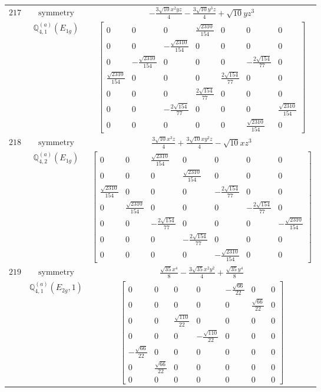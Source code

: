\documentclass[fleqn,8pt,landscape]{jsarticle}
\begin{document}
\begin{longtable}{ccc}
$ 217 $ & $ \text{symmetry} $ & $ - \frac{3 \sqrt{10} x^{2} y z}{4} - \frac{3 \sqrt{10} y^{3} z}{4} + \sqrt{10} y z^{3} $ \\
$  $ & $ \mathbb{Q}_{4,1}^{(a)}(E_{1g}) $ & $ \begin{bmatrix} 0 & 0 & 0 & \frac{\sqrt{2310}}{154} & 0 & 0 & 0 \\ 0 & 0 & - \frac{\sqrt{2310}}{154} & 0 & 0 & 0 & 0 \\ 0 & - \frac{\sqrt{2310}}{154} & 0 & 0 & 0 & - \frac{2 \sqrt{154}}{77} & 0 \\ \frac{\sqrt{2310}}{154} & 0 & 0 & 0 & \frac{2 \sqrt{154}}{77} & 0 & 0 \\ 0 & 0 & 0 & \frac{2 \sqrt{154}}{77} & 0 & 0 & 0 \\ 0 & 0 & - \frac{2 \sqrt{154}}{77} & 0 & 0 & 0 & \frac{\sqrt{2310}}{154} \\ 0 & 0 & 0 & 0 & 0 & \frac{\sqrt{2310}}{154} & 0 \end{bmatrix} $ \\ \hline
$ 218 $ & $ \text{symmetry} $ & $ \frac{3 \sqrt{10} x^{3} z}{4} + \frac{3 \sqrt{10} x y^{2} z}{4} - \sqrt{10} x z^{3} $ \\
$  $ & $ \mathbb{Q}_{4,2}^{(a)}(E_{1g}) $ & $ \begin{bmatrix} 0 & 0 & \frac{\sqrt{2310}}{154} & 0 & 0 & 0 & 0 \\ 0 & 0 & 0 & \frac{\sqrt{2310}}{154} & 0 & 0 & 0 \\ \frac{\sqrt{2310}}{154} & 0 & 0 & 0 & - \frac{2 \sqrt{154}}{77} & 0 & 0 \\ 0 & \frac{\sqrt{2310}}{154} & 0 & 0 & 0 & - \frac{2 \sqrt{154}}{77} & 0 \\ 0 & 0 & - \frac{2 \sqrt{154}}{77} & 0 & 0 & 0 & - \frac{\sqrt{2310}}{154} \\ 0 & 0 & 0 & - \frac{2 \sqrt{154}}{77} & 0 & 0 & 0 \\ 0 & 0 & 0 & 0 & - \frac{\sqrt{2310}}{154} & 0 & 0 \end{bmatrix} $ \\ \hline
$ 219 $ & $ \text{symmetry} $ & $ \frac{\sqrt{35} x^{4}}{8} - \frac{3 \sqrt{35} x^{2} y^{2}}{4} + \frac{\sqrt{35} y^{4}}{8} $ \\
$  $ & $ \mathbb{Q}_{4,1}^{(a)}(E_{2g},1) $ & $ \begin{bmatrix} 0 & 0 & 0 & 0 & - \frac{\sqrt{66}}{22} & 0 & 0 \\ 0 & 0 & 0 & 0 & 0 & \frac{\sqrt{66}}{22} & 0 \\ 0 & 0 & \frac{\sqrt{110}}{22} & 0 & 0 & 0 & 0 \\ 0 & 0 & 0 & - \frac{\sqrt{110}}{22} & 0 & 0 & 0 \\ - \frac{\sqrt{66}}{22} & 0 & 0 & 0 & 0 & 0 & 0 \\ 0 & \frac{\sqrt{66}}{22} & 0 & 0 & 0 & 0 & 0 \\ 0 & 0 & 0 & 0 & 0 & 0 & 0 \end{bmatrix} $ \\ \hline

\end{longtable}
\end{document}
